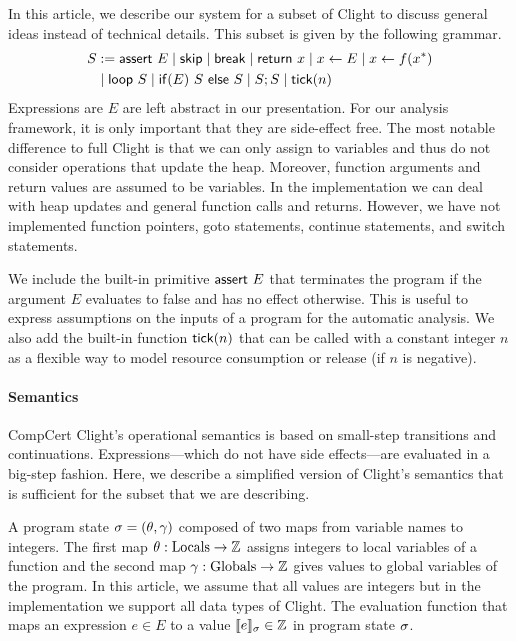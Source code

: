 \documentclass[nocopyrightspace,preprint]{sigplanconf}
\begin{document}
In this article, we describe our system for a subset of Clight to
discuss general ideas instead of technical details.  This subset is
given by the following grammar.
%
\begin{align*}
S &:= \mathsf{assert}~E
\mid \mathsf{skip}
\mid \mathsf{break}
\mid \mathsf{return}~x
\mid x \gets E
\mid x \gets f(x^*)
\\
& \mid \mathsf{loop}~S
\mid \mathsf{if}(E)~S~\mathsf{else}~S
\mid S;S
\mid \mathsf{tick}(n)
\end{align*}
%
Expressions are $E$ are left abstract in our presentation.  For our
analysis framework, it is only important that they are side-effect
free.
%
The most notable difference to full Clight is that we can only assign
to variables and thus do not consider operations that update the heap.
Moreover, function arguments and return values are assumed to be
variables.  In the implementation we can deal with heap updates and
general function calls and returns.  However, we have not implemented
function pointers, goto statements, continue statements, and switch
statements.

We include the built-in primitive $\mathsf{assert}~E$ that terminates
the program if the argument $E$ evaluates to false and has no effect
otherwise.  This is useful to express assumptions on the inputs of a
program for the automatic analysis.  We also add the built-in function
$\mathsf{tick}(n)$ that can be called with a constant integer $n$ as a
flexible way to model resource consumption or release (if $n$ is
negative).


\paragraph{Semantics}

CompCert Clight's operational semantics is based on small-step
transitions and continuations.  Expressions---which do not have side
effects---are evaluated in a big-step fashion.  Here, we describe a
simplified version of Clight's semantics that is sufficient for the
subset that we are describing.

A program state $\sigma = (\theta, \gamma)$ composed of two maps from
variable names to integers. The first map $\theta : \text{Locals} \to
\mathbb{Z}$ assigns integers to local variables of a function and the second
map $\gamma : \text{Globals} \to \mathbb{Z}$ gives values to global variables
of the program.  In this article, we assume that all values are
integers but in the implementation we support all data types of
Clight.
%
The evaluation function \evalE{\cdot}{} that maps an expression $e \in
E$ to a value $\llbracket e \rrbracket_{\sigma} \in \mathbb{Z}$ in program state $\sigma$.
\end{document}
